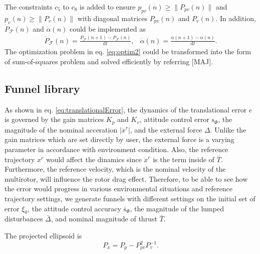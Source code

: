 \documentclass[letterpaper, 10 pt, conference]{ieeeconf}  %
\begin{document}
The constraints $c_5$ to $c_8$ is added to ensure
 $p_{pv}(n) \geq \|P_{pv}(n)\|$ and $p_v(n) \geq \|P_v(n)\|$ 
with diagonal matrices $P_{pv}(n)$ and $P_v(n)$.
In addition, $\dot{P}_\mathcal{F}(n)$ and $\dot{\alpha}(n)$ could be implemented as
\begin{equation}
\begin{array}{cc}
\dot{P}_\mathcal{F}(n) = \frac{P_\mathcal{F}(n+1) - P_\mathcal{F}(n)}{\text{d}t}, & \dot{\alpha}(n) = \frac{\alpha(n+1)-\alpha(n)}{\text{d}t}. 
\end{array} \nonumber
\end{equation}
The optimization problem in eq. \eqref{eq:optim2} could be transformed into the form of sum-of-squares problem and solved efficiently by referring [MAJ].

\subsection{Funnel library}
As shown in eq. \eqref{eq:translationalError}, the dynamics of the translational error $e$ is governed by the gain matrices $K_p$ and $K_v$, attitude control error $\text{s}_\Phi$, the magnitude of the nominal acceration $|\ddot{x}^r|$, and the external force $\Delta$.  
Unlike the gain matrices which are set directly by user, the external force is a varying parameter in accordance with environment condition.
Also, the reference trajectory $x^r$ would affect the dinamics since $\ddot{x}^r$ is the term inside of $\bar{T}$. Furthermore, the reference velocity, which is the nominal velocity of the multirotor, will influence the rotor drag effect.
Therefore, to be able to see how the error would progress in various environmental situations and reference trajectory settings, 
we generate funnels with different settings on the initial set of error $\xi_0$, the attitude control accuracy $\bar{\text{s}}_\Phi$, 
the magnitude of the lumped disturbances $\bar{\Delta}$, and nominal magnitude of thrust $\bar{T}$.



The projected ellipsoid is
\begin{equation}
P_x = P_p - P_{pv}^2 P_v^{-1}. \nonumber
\end{equation}
\end{document}
